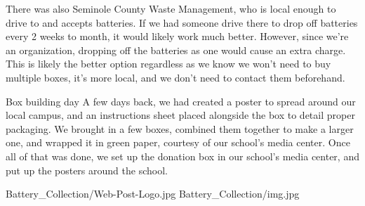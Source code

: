 {There was also Seminole County Waste Management, who is local enough to drive to and accepts batteries. If we had someone drive there to drop off batteries every 2 weeks to month, it would likely work much better. However, since we’re an organization, dropping off the batteries as one would cause an extra charge. This is likely the better option regardless as we know we won’t need to buy multiple boxes, it’s more local, and we don’t need to contact them beforehand.

Box building day
A few days back, we had created a poster to spread around our local campus, and an instructions sheet placed alongside the box to detail proper packaging. We brought in a few boxes, combined them together to make a larger one, and wrapped it in green paper, courtesy of our school’s media center. Once all of that was done, we set up the donation box in our school’s media center, and put up the posters around the school.
} 
{Battery_Collection/Web-Post-Logo.jpg}
{Battery_Collection/img.jpg}